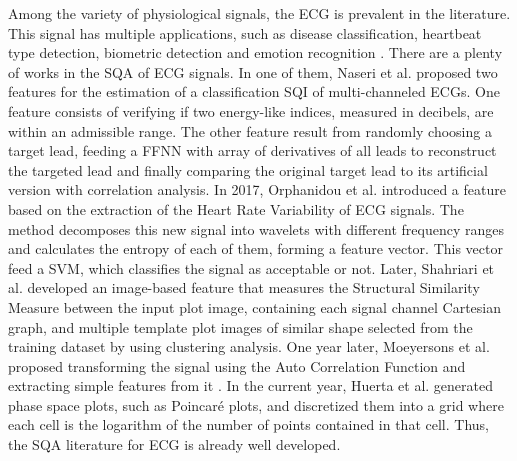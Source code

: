 
Among the variety of physiological signals, the \gls{ECG} is prevalent in the literature. This signal has multiple applications, such as disease classification, heartbeat type detection, biometric detection and emotion recognition \cite{ecg-1}. There are a plenty of works in the \gls{SQA} of ECG signals. In one of them, Naseri et al. \cite{ecg-2} proposed two features for the estimation of a classification \gls{SQI} of multi-channeled \gls{ECG}s. One feature consists of verifying if two energy-like indices, measured in decibels, are within an admissible range. The other feature result from randomly choosing a target lead, feeding a \gls{FFNN} with array of derivatives of all leads to reconstruct the targeted lead and finally comparing the original target lead to its artificial version with correlation analysis. In 2017, Orphanidou et al. \cite{ecg-3} introduced a feature based on the extraction of the Heart Rate Variability of \gls{ECG} signals. The method decomposes this new signal into wavelets with different frequency ranges and calculates the entropy of each of them, forming a feature vector. This vector feed a \gls{SVM}, which classifies the signal as acceptable or not. Later, Shahriari et al. \cite{ecg-4} developed an image-based feature that measures the Structural Similarity Measure between the input plot image, containing each signal channel Cartesian graph, and multiple template plot images of similar shape selected from the training dataset by using clustering analysis. One year later, Moeyersons et al. \cite{ecg-5} proposed transforming the signal using the Auto Correlation Function and extracting simple features from it \cite{ecg-5}. In the current year, Huerta et al. \cite{ecg-6} generated phase space plots, such as Poincaré plots, and discretized them into a grid where each cell is the logarithm of the number of points contained in that cell. Thus, the \gls{SQA} literature for \gls{ECG} is already well developed.

